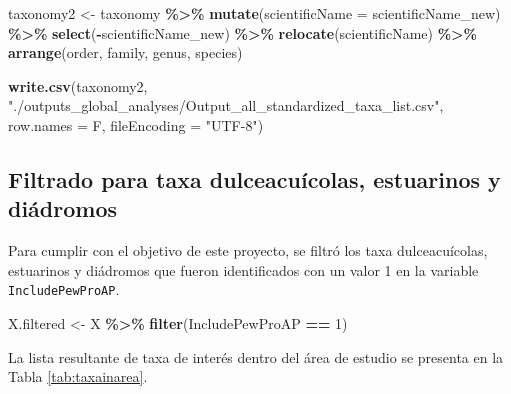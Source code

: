 \documentclass[sn-apa,pdflatex]{sn-jnl}
\newenvironment{Shaded}{\begin{snugshade}}{\end{snugshade}}
\newcommand{\AttributeTok}[1]{\textcolor[rgb]{0.13,0.29,0.53}{#1}}
\newcommand{\DecValTok}[1]{\textcolor[rgb]{0.00,0.00,0.81}{#1}}
\newcommand{\FunctionTok}[1]{\textcolor[rgb]{0.13,0.29,0.53}{\textbf{#1}}}
\newcommand{\NormalTok}[1]{#1}
\newcommand{\OtherTok}[1]{\textcolor[rgb]{0.56,0.35,0.01}{#1}}
\newcommand{\SpecialCharTok}[1]{\textcolor[rgb]{0.81,0.36,0.00}{\textbf{#1}}}
\newcommand{\StringTok}[1]{\textcolor[rgb]{0.31,0.60,0.02}{#1}}
\begin{document}
\begin{Shaded}
\begin{Highlighting}[]
\NormalTok{taxonomy2 }\OtherTok{\textless{}{-}}\NormalTok{ taxonomy }\SpecialCharTok{\%\textgreater{}\%}
    \FunctionTok{mutate}\NormalTok{(}\AttributeTok{scientificName =}\NormalTok{ scientificName\_new) }\SpecialCharTok{\%\textgreater{}\%}
    \FunctionTok{select}\NormalTok{(}\SpecialCharTok{{-}}\NormalTok{scientificName\_new) }\SpecialCharTok{\%\textgreater{}\%}
    \FunctionTok{relocate}\NormalTok{(scientificName) }\SpecialCharTok{\%\textgreater{}\%}
    \FunctionTok{arrange}\NormalTok{(order, family, genus, species)}

\FunctionTok{write.csv}\NormalTok{(taxonomy2, }\StringTok{"./outputs\_global\_analyses/Output\_all\_standardized\_taxa\_list.csv"}\NormalTok{,}
    \AttributeTok{row.names =}\NormalTok{ F, }\AttributeTok{fileEncoding =} \StringTok{"UTF{-}8"}\NormalTok{)}
\end{Highlighting}
\end{Shaded}

\subsection{Filtrado para taxa dulceacuícolas, estuarinos y
diádromos}\label{filtrado-para-taxa-dulceacuuxedcolas-estuarinos-y-diuxe1dromos}

Para cumplir con el objetivo de este proyecto, se filtró los taxa
dulceacuícolas, estuarinos y diádromos que fueron identificados con un
valor 1 en la variable \texttt{IncludePewProAP}.

\begin{Shaded}
\begin{Highlighting}[]
\NormalTok{X.filtered }\OtherTok{\textless{}{-}}\NormalTok{ X }\SpecialCharTok{\%\textgreater{}\%}
    \FunctionTok{filter}\NormalTok{(IncludePewProAP }\SpecialCharTok{==} \DecValTok{1}\NormalTok{)}
\end{Highlighting}
\end{Shaded}

La lista resultante de taxa de interés dentro del área de estudio se
presenta en la Tabla \ref{tab:taxainarea}.\\
\newpage   \begingroup\fontsize{8}{10}\selectfont
\end{document}
